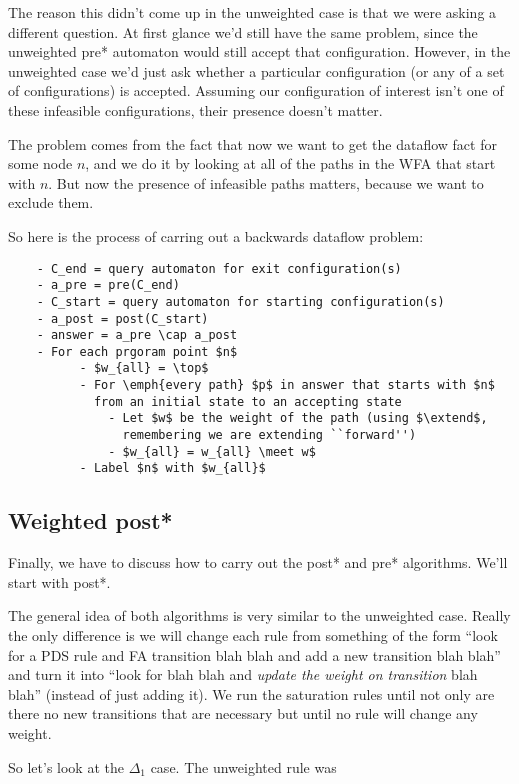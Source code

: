 \documentclass{article}
\newcommand{\meet}{\sqcap}
\newcommand{\extend}{\otimes}
\begin{document}
  The reason this didn't come up in the unweighted case is that we
  were asking a different question. At first glance we'd still have
  the same problem, since the unweighted pre* automaton would still
  accept that configuration. However, in the unweighted case we'd just
  ask whether a particular configuration (or any of a set of
  configurations) is accepted. Assuming our configuration of interest
  isn't one of these infeasible configurations, their presence doesn't
  matter.
  
  The problem comes from the fact that now we want to get the dataflow
  fact for some node $n$, and we do it by looking at all of the paths
  in the WFA that start with $n$. But now the presence of infeasible
  paths matters, because we want to exclude them.

So here is the process of carring out a backwards dataflow problem:
\begin{verbatim}
    - C_end = query automaton for exit configuration(s)
    - a_pre = pre(C_end)
    - C_start = query automaton for starting configuration(s)
    - a_post = post(C_start)
    - answer = a_pre \cap a_post
    - For each prgoram point $n$
          - $w_{all} = \top$
          - For \emph{every path} $p$ in answer that starts with $n$
            from an initial state to an accepting state
              - Let $w$ be the weight of the path (using $\extend$,
                remembering we are extending ``forward'')
              - $w_{all} = w_{all} \meet w$
          - Label $n$ with $w_{all}$
\end{verbatim}

\subsection{Weighted post*}

Finally, we have to discuss how to carry out the post* and pre*
algorithms. We'll start with post*.

The general idea of both algorithms is very similar to the unweighted
case. Really the only difference is we will change each rule from
something of the form ``look for a PDS rule and FA transition blah
blah and add a new transition blah blah'' and turn it into ``look for
blah blah and \emph{update the weight on transition} blah blah''
(instead of just adding it). We run the saturation rules until not
only are there no new transitions that are necessary but until no rule
will change any weight.

So let's look at the $\Delta_1$ case. The unweighted rule was
\end{document}
